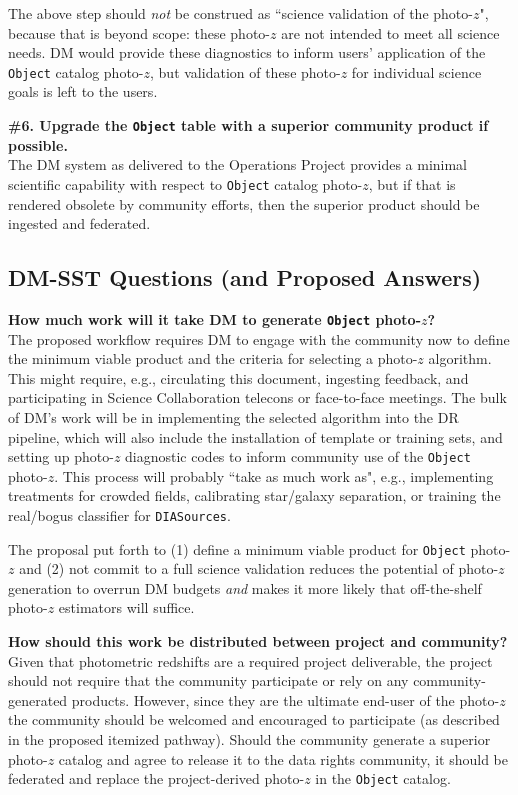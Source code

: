 \documentclass[DM,lsstdraft,toc]{lsstdoc}
\begin{document}
The above step should {\it not} be construed as ``science validation of the photo-$z$", because that is beyond scope: these photo-$z$ are not intended to meet all science needs. 
DM would provide these diagnostics to inform users' application of the {\tt Object} catalog photo-$z$, but validation of these photo-$z$ for individual science goals is left to the users.

{\bf \#6. Upgrade the {\tt Object} table with a superior community product if possible.}\\
The DM system as delivered to the Operations Project provides a minimal scientific capability with respect to {\tt Object} catalog photo-$z$, but if that is rendered obsolete by community efforts, then the superior product should be ingested and federated.

\subsection{DM-SST Questions (and Proposed Answers)}\label{ssec:path_faq}

{\bf How much work will it take DM to generate {\tt Object} photo-$z$?}\\
The proposed workflow requires DM to engage with the community now to define the minimum viable product and the criteria for selecting a photo-$z$ algorithm.
This might require, e.g., circulating this document, ingesting feedback, and participating in Science Collaboration telecons or face-to-face meetings.
The bulk of DM's work will be in implementing the selected algorithm into the DR pipeline, which will also include the installation of template or training sets, and setting up photo-$z$ diagnostic codes to inform community use of the {\tt Object} photo-$z$.
This process will probably ``take as much work as", e.g., implementing treatments for crowded fields, calibrating star/galaxy separation, or training the real/bogus classifier for {\tt DIASources}.

The proposal put forth to (1) define a minimum viable product for {\tt Object} photo-$z$ and (2) not commit to a full science validation reduces the potential of photo-$z$ generation to overrun DM budgets {\it and} makes it more likely that off-the-shelf photo-$z$ estimators will suffice. 

{\bf How should this work be distributed between project and community?}\\
Given that photometric redshifts are a required project deliverable, the project should not require that the community participate or rely on any community-generated products.
However, since they are the ultimate end-user of the photo-$z$ the community should be welcomed and encouraged to participate (as described in the proposed itemized pathway).
Should the community generate a superior photo-$z$ catalog and agree to release it to the data rights community, it should be federated and replace the project-derived photo-$z$ in the {\tt Object} catalog.
\end{document}
